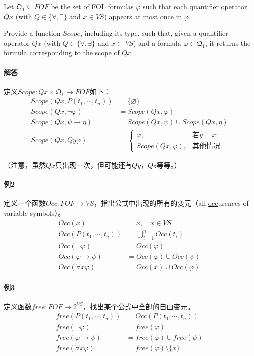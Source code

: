 \documentclass[b5paper,oneside]{ctexbook}
\begin{document}
Let $\mathfrak{Q}_{1}\subseteq FOF$ be the set of FOL formulas $\varphi$ such that each quantifier operator $Qx$ (with $Q\in\{\forall,\exists\}$ and $x\in VS$) appears at most once in $\varphi$. 

Provide a function $Scope$, including its type, such that, given a quantifier operator $Qx$ (with $Q\in\{\forall,\exists\}$ and $x\in\ VS$) and a formula $\varphi\in \mathfrak{Q}_{1}$, it returns the formula corresponding to the scope of $Qx$.
\paragraph{解答}定义$Scope\colon Qx\times\mathfrak{Q}_{1}\to FOF$如下：
\begin{align*}
Scope(Qx,P(t_1,\cdots ,t_n))&=\{\varnothing\}
\\Scope(Qx,\neg\varphi)&=Scope(Qx,\varphi)
\\Scope(Qx,\psi\rightarrow\eta)&=Scope(Qx,\psi)\cup Scope(Qx,\eta)
\\Scope(Qx,Qy\varphi)&=\begin{cases}\varphi,&\text{若}y=x;
\\Scope(Qx,\varphi),&\text{其他情况}.\end{cases}
\end{align*}

（注意，虽然$Qx$只出现一次，但可能还有$Qy$，$Qz$等等。）
\paragraph{例2}定义一个函数$Occ:FOF\to VS$，指出公式中出现的所有的变元（all \underline{occ}urences of variable symbols）。
\begin{align*}
Occ(x)&=x,\quad x\in VS
\\Occ(P(t_1,\cdots ,t_n))&=\bigcup\limits_{i=1}^n Occ(t_i)
\\Occ(\neg\varphi)&=Occ(\varphi)
\\Occ(\varphi\to\psi)&=Occ(\varphi)\cup Occ(\psi)
\\Occ(\forall x\varphi)&=Occ(x)\cup Occ(\varphi)
\end{align*}
\paragraph{例3}定义函数$free:FOF\to 2^{VS}$，找出某个公式中全部的自由变元。
\begin{align*}
free(P(t_1,\cdots ,t_n))&=Occ(P(t_1,\cdots ,t_n))
\\free(\neg\varphi)&=free(\varphi)
\\free(\varphi\to\psi)&=free(\varphi)\cup free(\psi)
\\free(\forall x\varphi)&=free(\varphi)\setminus\{x\}
\end{align*}
\end{document}

